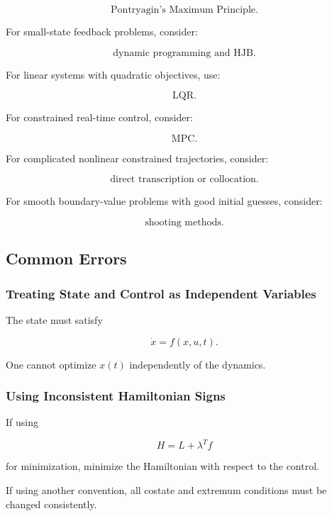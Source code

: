\[
\boxed{
\text{Pontryagin's Maximum Principle}.
}
\]

For small-state feedback problems, consider:

\[
\boxed{
\text{dynamic programming and HJB}.
}
\]

For linear systems with quadratic objectives, use:

\[
\boxed{
\text{LQR}.
}
\]

For constrained real-time control, consider:

\[
\boxed{
\text{MPC}.
}
\]

For complicated nonlinear constrained trajectories, consider:

\[
\boxed{
\text{direct transcription or collocation}.
}
\]

For smooth boundary-value problems with good initial guesses, consider:

\[
\boxed{
\text{shooting methods}.
}
\]

\subsection{Common Errors}
\label{subsec:optimal-control-common-errors}

\subsubsection{Treating State and Control as Independent Variables}

The state must satisfy

\[
\boxed{
\dot{x}=f(x,u,t).
}
\]

One cannot optimize \(x(t)\) independently of the dynamics.

\subsubsection{Using Inconsistent Hamiltonian Signs}

If using

\[
H=L+\lambda^Tf
\]

for minimization, minimize the Hamiltonian with respect to the control.

If using another convention, all costate and extremum conditions must be
changed consistently.

